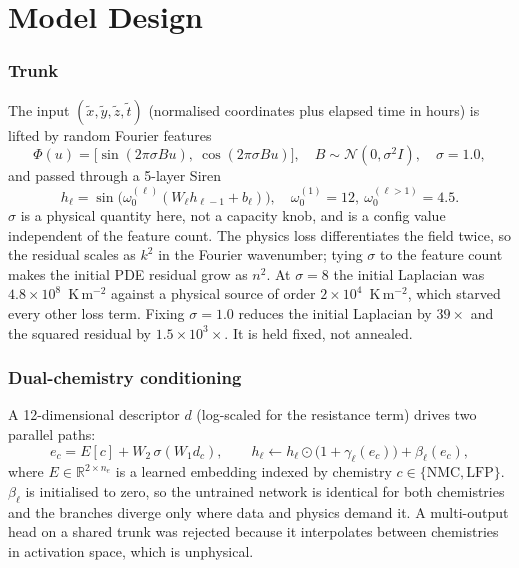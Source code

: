 \documentclass[10.5pt,a4paper]{article}
\begin{document}
\section*{Model Design}
\subsubsection*{Trunk}
The input $(\tilde x,\tilde y,\tilde z,\tilde t)$ (normalised coordinates plus elapsed time in hours) is lifted by random Fourier features
\begin{equation}
  \Phi(u)=\big[\sin(2\pi\sigma Bu),\ \cos(2\pi\sigma Bu)\big],\quad B\sim\mathcal{N}(0,\sigma^2 I),\quad \sigma=1.0,
\end{equation}
and passed through a 5-layer Siren
\begin{equation}
  h_\ell=\sin\!\big(\omega_0^{(\ell)}(W_\ell h_{\ell-1}+b_\ell)\big),\quad \omega_0^{(1)}=12,\ \omega_0^{(\ell>1)}=4.5 .
\end{equation}
$\sigma$ is a physical quantity here, not a capacity knob, and is a config value independent of the feature count. The physics loss differentiates the field twice, so the residual scales as $k^2$ in the Fourier wavenumber; tying $\sigma$ to the feature count makes the initial PDE residual grow as $n^2$. At $\sigma=8$ the initial Laplacian was $4.8\times10^{8}$~K\,m$^{-2}$ against a physical source of order $2\times10^{4}$~K\,m$^{-2}$, which starved every other loss term. Fixing $\sigma=1.0$ reduces the initial Laplacian by $39\times$ and the squared residual by $1.5\times10^{3}\times$. It is held fixed, not annealed.

\subsubsection*{Dual-chemistry conditioning}
A 12-dimensional descriptor $d$ (log-scaled for the resistance term) drives two parallel paths:
\begin{equation}
  e_c = E[c] + W_2\,\sigma(W_1 d_c),\qquad h_\ell \leftarrow h_\ell\odot\big(1+\gamma_\ell(e_c)\big)+\beta_\ell(e_c),
\end{equation}
where $E\in\mathbb{R}^{2\times n_e}$ is a learned embedding indexed by chemistry $c\in\{\text{NMC},\text{LFP}\}$. $\beta_\ell$ is initialised to zero, so the untrained network is identical for both chemistries and the branches diverge only where data and physics demand it. A multi-output head on a shared trunk was rejected because it interpolates between chemistries in activation space, which is unphysical.
\end{document}
